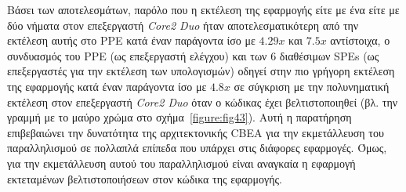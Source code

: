 Βάσει των αποτελεσμάτων, παρόλο που η εκτέλεση της εφαρμογής είτε με ένα είτε με δύο νήματα στον επεξεργαστή \textsl{Core2 Duo} ήταν αποτελεσματικότερη από την εκτέλεση αυτής στο \ac{PPE} κατά έναν παράγοντα ίσο με \(4.29x\) και \(7.5x\) αντίστοιχα, ο συνδυασμός του \ac{PPE} (ως επεξεργαστή ελέγχου) και των \(6\) διαθέσιμων \acp{SPE} (ως επεξεργαστές για την εκτέλεση των υπολογισμών) οδηγεί στην πιο γρήγορη εκτέλεση της εφαρμογής κατά έναν παράγοντα ίσο με \(4.8x\) σε σύγκριση με την πολυνηματική εκτέλεση στον επεξεργαστή \textsl{Core2 Duo} όταν ο κώδικας έχει βελτιστοποιηθεί (βλ. την γραμμή με το μαύρο χρώμα στο σχήμα~\ref{figure:fig43}). Αυτή η παρατήρηση επιβεβαιώνει την δυνατότητα της αρχιτεκτονικής \ac{CBEA} για την εκμετάλλευση του παραλληλισμού σε πολλαπλά επίπεδα που υπάρχει στις διάφορες εφαρμογές. Όμως, για την εκμετάλλευση αυτού του παραλληλισμού είναι αναγκαία η εφαρμογή εκτεταμένων βελτιστοποιήσεων στον κώδικα της εφαρμογής.

